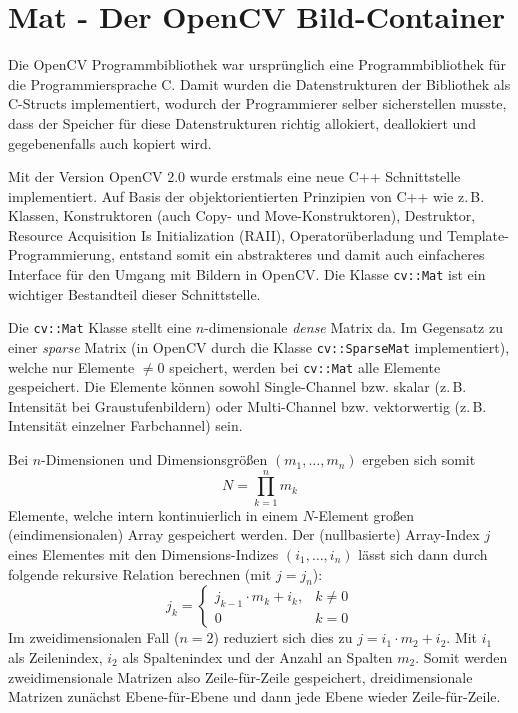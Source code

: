 \documentclass{whswinvcbook}
\begin{document}
\section{Mat - Der OpenCV Bild-Container}\label{section-mat}
Die OpenCV Programmbibliothek war ursprünglich eine Programmbibliothek für die Programmiersprache C. Damit wurden die Datenstrukturen der Bibliothek als C-Structs implementiert, wodurch der Programmierer selber sicherstellen musste, dass der Speicher für diese Datenstrukturen richtig allokiert, deallokiert und gegebenenfalls auch kopiert wird.\cite{kms1}

Mit der Version OpenCV 2.0 wurde erstmals eine neue C++ Schnittstelle implementiert. Auf Basis der objektorientierten Prinzipien von C++ wie z.\,B. Klassen, Konstruktoren (auch Copy- und Move-Konstruktoren), Destruktor, Resource Acquisition Is Initialization (RAII), Operatorüberladung und Template-Programmierung, entstand somit ein abstrakteres und damit auch einfacheres Interface für den Umgang mit Bildern in OpenCV. Die Klasse \texttt{cv::Mat} ist ein wichtiger Bestandteil dieser Schnittstelle.

Die \texttt{cv::Mat} Klasse stellt eine $n$-dimensionale \textit{dense} Matrix da. Im Gegensatz zu einer \textit{sparse} Matrix (in OpenCV durch die Klasse \texttt{cv::SparseMat} implementiert), welche nur Elemente $\neq0$ speichert, werden bei \texttt{cv::Mat} alle Elemente gespeichert. Die Elemente können sowohl Single-Channel bzw. skalar (z.\,B. Intensität bei Graustufenbildern) oder Multi-Channel bzw. vektorwertig (z.\,B. Intensität einzelner Farbchannel) sein.

Bei $n$-Dimensionen und Dimensionsgrößen $(m_1,\dots,m_n)$ ergeben sich somit $$N=\prod_{k=1}^{n}m_k$$ Elemente, welche intern kontinuierlich in einem $N$-Element großen (eindimensionalen) Array gespeichert werden. Der (nullbasierte) Array-Index $j$ eines Elementes mit den Dimensions-Indizes $(i_1,\dots,i_n)$ lässt sich dann durch folgende rekursive Relation berechnen\cite{opencv2} (mit $j=j_n$): $$j_k=\begin{cases}j_{k-1}\cdot m_k+i_k,&k\neq0\\0&k=0\end{cases}$$
Im zweidimensionalen Fall ($n=2$) reduziert sich dies zu $j=i_1\cdot m_2+i_2$. Mit $i_1$ als Zeilenindex, $i_2$ als Spaltenindex und der Anzahl an Spalten $m_2$. Somit werden zweidimensionale Matrizen also Zeile-für-Zeile gespeichert, dreidimensionale Matrizen zunächst Ebene-für-Ebene und dann jede Ebene wieder Zeile-für-Zeile.
\end{document}
